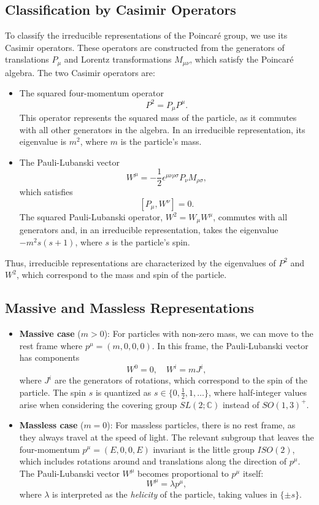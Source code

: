 \subsection{Classification by Casimir Operators}

To classify the irreducible representations of the Poincaré group, we use its Casimir operators. These operators are constructed from the generators of translations $P_\mu$ and Lorentz transformations $M_{\mu \nu}$, which satisfy the Poincaré algebra. The two Casimir operators are:
\begin{itemize}
    \item The squared four-momentum operator
    \[
    P^2 = P_\mu P^\mu.
    \]
    This operator represents the squared mass of the particle, as it commutes with all other generators in the algebra. In an irreducible representation, its eigenvalue is $m^2$, where $m$ is the particle's mass.
    
    \item The Pauli-Lubanski vector
    \[
    W^\mu = -\frac{1}{2} \epsilon^{\mu \nu \rho \sigma} P_\nu M_{\rho \sigma},
    \]
    which satisfies
    \[
    [P_\mu, W^\nu] = 0.
    \]
    The squared Pauli-Lubanski operator, $W^2 = W_\mu W^\mu$, commutes with all generators and, in an irreducible representation, takes the eigenvalue $-m^2 s(s+1)$, where $s$ is the particle’s spin.
\end{itemize}

Thus, irreducible representations are characterized by the eigenvalues of $P^2$ and $W^2$, which correspond to the mass and spin of the particle.

\subsection{Massive and Massless Representations}

\begin{itemize}
    \item \textbf{Massive case} ($m > 0$): For particles with non-zero mass, we can move to the rest frame where $p^\mu = (m, 0, 0, 0)$. In this frame, the Pauli-Lubanski vector has components
    \[
    W^0 = 0, \quad W^i = m J^i,
    \]
    where $J^i$ are the generators of rotations, which correspond to the spin of the particle. The spin $s$ is quantized as $s \in \{0, \frac{1}{2}, 1, \dots \}$, where half-integer values arise when considering the covering group $SL(2; \mathbb{C})$ instead of $SO(1,3)^+$.
    
    \item \textbf{Massless case} ($m = 0$): For massless particles, there is no rest frame, as they always travel at the speed of light. The relevant subgroup that leaves the four-momentum $p^\mu = (E, 0, 0, E)$ invariant is the little group $ISO(2)$, which includes rotations around and translations along the direction of $p^\mu$. The Pauli-Lubanski vector $W^\mu$ becomes proportional to $p^\mu$ itself:
    \[
    W^\mu = \lambda p^\mu,
    \]
    where $\lambda$ is interpreted as the \emph{helicity} of the particle, taking values in $\{\pm s\}$.
\end{itemize}

